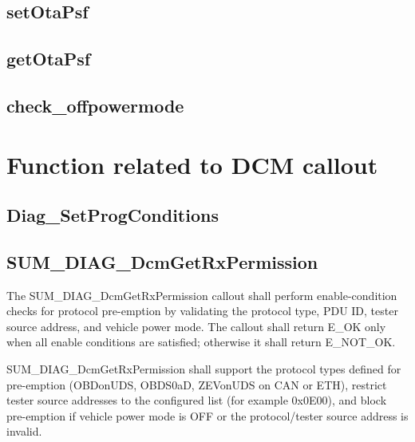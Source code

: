 \subsection{setOtaPsf}

{

}
{ }

\subsection{getOtaPsf}

{

}
{}

\subsection{check_offpowermode}

{

}
{}

\section{Function related to DCM callout}

\subsection{Diag_SetProgConditions}
\label{subsec:Diag_SetProgConditions}

{

}
{}

\subsection{SUM\_DIAG\_DcmGetRxPermission}
\label{subsec:DIAG_DcmGetRxPermission}

{
The SUM\_DIAG\_DcmGetRxPermission callout shall perform enable-condition checks for protocol pre-emption by validating the protocol type, PDU ID, tester source address, and vehicle power mode. The callout shall return E\_OK only when all enable conditions are satisfied; otherwise it shall return E\_NOT\_OK.
}
{ }

{
SUM\_DIAG\_DcmGetRxPermission shall support the protocol types defined for pre-emption (OBDonUDS, OBDS0aD, ZEVonUDS on CAN or ETH), restrict tester source addresses to the configured list (for example 0x0E00), and block pre-emption if vehicle power mode is OFF or the protocol/tester source address is invalid.
}
{ }

